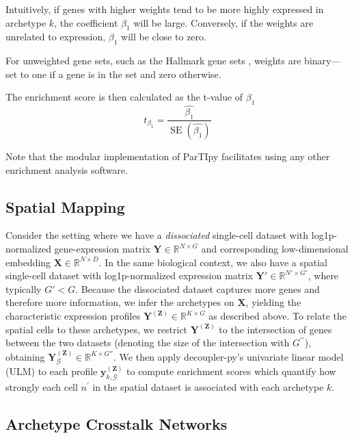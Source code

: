 \documentclass[oneside]{article}
\begin{document}
Intuitively, if genes with higher weights tend to be more highly expressed in archetype $k$, the coefficient $\beta_1$ will be large. Conversely, if the weights are unrelated to expression, $\beta_1$ will be close to zero.

For unweighted gene sets, such as the Hallmark gene sets \autocite{subramanianGSEA2005}, weights are binary—set to one if a gene is in the set and zero otherwise.

The enrichment score is then calculated as the t-value of $\beta_1$
\begin{equation}
    t_{\beta_1} = \frac{\hat{\beta_1}}{\operatorname{SE}(\hat{\beta_1})}
\end{equation}

Note that the modular implementation of ParTIpy facilitates using any other enrichment analysis software.

\subsection{Spatial Mapping}
\label{subsec:spatial_mapping}

Consider the setting where we have a \emph{dissociated} single-cell dataset with log1p-normalized gene-expression matrix $\mathbf{Y}\in\mathbb{R}^{N\times G}$ and corresponding low-dimensional embedding $\mathbf{X}\in\mathbb{R}^{N\times D}$. In the same biological context, we also have a spatial single-cell dataset with log1p-normalized expression matrix $\mathbf{Y}'\in\mathbb{R}^{N'\times G'}$, where typically $G' < G$. Because the dissociated dataset captures more genes and therefore more information, we infer the archetypes on $\mathbf{X}$, yielding the characteristic expression profiles $\mathbf{Y}^{(\mathbf{Z})}\in\mathbb{R}^{K\times G}$ as described above. To relate the spatial cells to these archetypes, we restrict $\mathbf{Y}^{(\mathbf{Z})}$ to the intersection of genes between the two datasets (denoting the size of the intersection with $G^{\prime \prime}$), obtaining $\mathbf{Y}^{(\mathbf{Z})}_{\mathcal{G}}\in\mathbb{R}^{K\times G''}$. We then apply decoupler-py's univariate linear model (ULM) \autocite{badiaDecoupler2022} to each profile $\mathbf{y}^{(\mathbf{Z})}_{k,\mathcal{G}}$ to compute enrichment scores which quantify how strongly each cell $n^\prime$ in the spatial dataset is associated with each archetype $k$.

\subsection{Archetype Crosstalk Networks}
\label{subsec:crosstalk}
\end{document}
